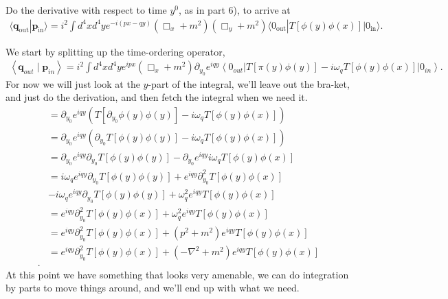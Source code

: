 \documentclass[working, oneside]{../../Preambles/tuftebook}
\begin{document}
\begin{exercise}[9]
Do the derivative with respect to time $y^0$, as in part 6), to arrive at
\begin{align*}
\langle \mathbf{q}_{\text{out}} | \mathbf{p}_{\text{in}} \rangle = i^2 \int d^4x d^4y e^{-i(px - qy)} (\Box_x + m^2) (\Box_y + m^2) \langle 0_{\text{out}} | T \left[ \phi(y) \phi(x) \right] | 0_{\text{in}} \rangle. \tag{97}
\end{align*}
\end{exercise}
\begin{solution}
We start by splitting up the time-ordering operator,
\begin{align*}
    \left<\mathbf{q}_{out} \mid \mathbf{p}_{in} \right> = i^2 \int d^{4}xd^{4}y e^{ipx} \left( \Box_x + m^2 \right) \partial_{y_{0}}e^{iqy}\left<0_{out} \right| T \left[ \pi\left( y \right) \phi \left( y \right)  \right] - i\omega_qT\left[ \phi \left( y \right) \phi \left( x \right)  \right] \left|0_{in} \right>
.\end{align*}
For now we will just look at the $y$-part of the integral, we'll leave out the bra-ket, and just do the derivation, and then fetch the integral when we need it.
\begin{align*}
&= \partial_{y_{0}}e^{iqy} (T \left[\partial_{y_0} \phi\left( y \right) \phi \left( y \right)  \right] - i\omega_qT\left[ \phi \left( y \right) \phi \left( x \right)  \right])   \\
&= \partial_{y_{0}}e^{iqy} (\partial_{y_0}T \left[ \phi\left( y \right) \phi \left( y \right)  \right] - i\omega_qT\left[ \phi \left( y \right) \phi \left( x \right)  \right])   \\
&= \partial_{y_{0}}e^{iqy}\partial_{y_0}T \left[ \phi\left( y \right) \phi \left( y \right)  \right] - \partial_{y_{0}}e^{iqy}i\omega_qT\left[ \phi \left( y \right) \phi \left( x \right)  \right]   \\
&= i\omega_qe^{iqy}\partial_{y_0}T \left[ \phi\left( y \right) \phi \left( y \right)  \right] + e^{iqy}\partial^2_{y_0}T\left[ \phi \left( y \right) \phi \left( x \right)  \right]   \\
&- i\omega_{q} e^{iqy}\partial_{y_0}T \left[ \phi\left( y \right) \phi \left( y \right)  \right]  + \omega_q^2 e^{iqy}T\left[ \phi \left( y \right) \phi \left( x \right)  \right]   \\
&=  e^{iqy}\partial^2_{y_0}T\left[ \phi \left( y \right) \phi \left( x \right)  \right] + \omega_q^2 e^{iqy}T\left[ \phi \left( y \right) \phi \left( x \right)  \right]   \\
&=  e^{iqy}\partial^2_{y_0}T\left[ \phi \left( y \right) \phi \left( x \right)  \right] + \left( p^2 + m^2 \right)  e^{iqy}T\left[ \phi \left( y \right) \phi \left( x \right)  \right]   \\
&=  e^{iqy}\partial^2_{y_0}T\left[ \phi \left( y \right) \phi \left( x \right)  \right] + \left( -\nabla ^2 + m^2 \right)  e^{iqy}T\left[ \phi \left( y \right) \phi \left( x \right)  \right]   \\
.\end{align*}
At this point we have something that looks very amenable, we can do integration by parts to move things around, and we'll end up with what we need.
\end{solution}
\end{document}
